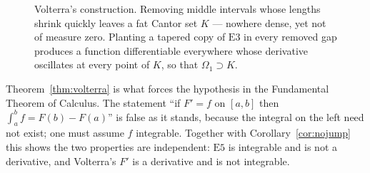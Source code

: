 \begin{figure}[htbp]
\centering
{}
\caption{Volterra's construction. Removing middle intervals whose lengths
shrink quickly leaves a fat Cantor set $K$ --- nowhere dense, yet not of
measure zero. Planting a tapered copy of $\mathrm{E}3$ in every removed gap
produces a function differentiable everywhere whose derivative oscillates at
every point of $K$, so that $\Omega_1 \supset K$.}
\label{fig:volterra}
\end{figure}

\begin{remark}
Theorem~\ref{thm:volterra} is what forces the hypothesis in the Fundamental
Theorem of Calculus. The statement ``if $F'=f$ on $[a,b]$ then
$\int_a^b f = F(b)-F(a)$'' is false as it stands, because the integral on the
left need not exist; one must assume $f$ integrable. Together with
Corollary~\ref{cor:nojump} this shows the two properties are independent:
$\mathrm{E}5$ is integrable and is not a derivative, and Volterra's $F'$ is a
derivative and is not integrable.
\end{remark}

